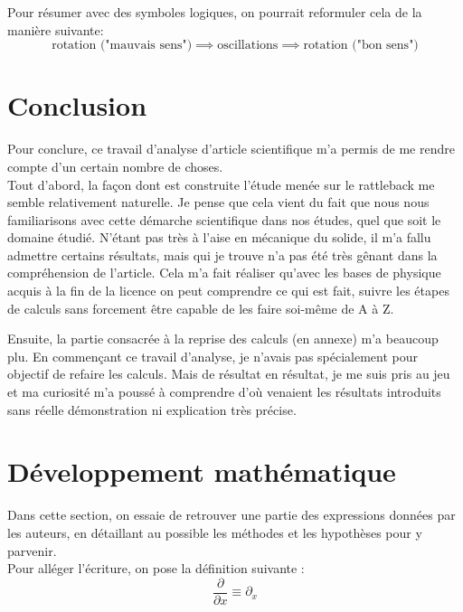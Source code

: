 \documentclass[12pt,a4paper]{article}
\begin{document}
	Pour résumer avec des symboles logiques, on pourrait reformuler cela de la manière suivante:
	$$\text{rotation ("mauvais sens")}\implies\text{oscillations}\implies\text{rotation ("bon sens")}$$
	
	\section{Conclusion}
	Pour conclure, ce travail d'analyse d'article scientifique m'a permis de me rendre compte d'un certain nombre de choses.\\
	
	Tout d'abord, la façon dont est construite l'étude menée sur le rattleback me semble relativement naturelle. Je pense que cela vient du fait que nous nous familiarisons avec cette démarche scientifique dans nos études, quel que soit le domaine étudié. N'étant pas très à l'aise en mécanique du solide, il m'a fallu admettre certains résultats, mais qui je trouve n'a pas été très gênant dans la compréhension de l'article. Cela m'a fait réaliser qu'avec les bases de physique acquis à la fin de la licence on peut comprendre ce qui est fait, suivre les étapes de calculs sans forcement être capable de les faire soi-même de A à Z.
	
	Ensuite, la partie consacrée à la reprise des calculs (en annexe) m'a beaucoup plu. En commençant ce travail d'analyse, je n'avais pas spécialement pour objectif de refaire les calculs. Mais de résultat en résultat, je me suis pris au jeu et ma curiosité m'a poussé à comprendre d'où venaient les résultats introduits sans réelle démonstration ni explication très précise.
	

	\pagebreak
	\appendix
	\appendixpage
	\section{Développement mathématique}
	\label{sec:calculs}
	Dans cette section, on essaie de retrouver une partie des expressions données par les auteurs, en détaillant au possible les méthodes et les hypothèses pour y parvenir.\\
	Pour alléger l'écriture, on pose la définition suivante :
	$$\dfrac{\partial}{\partial x}\equiv\partial_x$$ 
\end{document}
